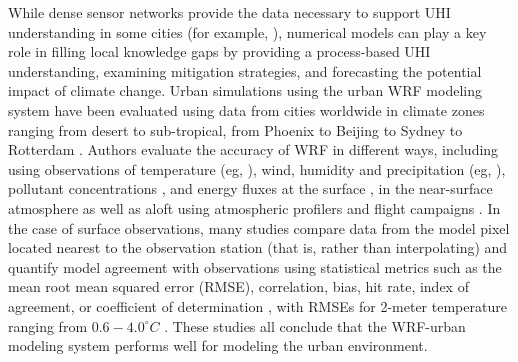 \documentclass[draft,linenumbers]{agujournal}
\begin{document}
While dense sensor networks provide the data necessary to support UHI understanding in some cities (for example, \cite{scott2017intraurban,scott2017temperature,madisonUHI,minneapolisUHI,tokyoUHI}), numerical models can play a key role in filling local knowledge gaps by providing a process-based UHI understanding, examining mitigation strategies, and forecasting the potential impact of climate change. 
Urban simulations using the urban WRF modeling system \citep{chen2011integrated} have been evaluated using data from cities worldwide in climate zones ranging from desert to sub-tropical, from Phoenix \citep{georgescu2013summer} to Beijing \citep{wang2013modeling} to Sydney \citep{argueso2014temperature} to Rotterdam \citep{theeuwes2014seasonal}. 
Authors evaluate the accuracy of WRF in different ways,
including using observations of temperature (eg, \citet{kusaka2012numerical}), wind, humidity and precipitation (eg, \cite{miao2011impacts,chen2011numerical}), pollutant concentrations \citep{brioude2013top}, and energy fluxes at the surface \citep{yang2015enhancing,loridan2012multi}, in the near-surface atmosphere as well as aloft using atmospheric profilers and flight campaigns \citep{li2013development}. 
In the case of surface observations, many studies compare data from the model pixel located nearest to the observation station (that is, rather than interpolating) and quantify model agreement with observations using statistical metrics such as the mean root mean squared error (RMSE), correlation, bias, hit rate, index of agreement, or coefficient of determination \citep{loridan2010trade,salamanca2011study,lee2011evaluation,chen2011numerical,chen2014wrf,li2013multi}, with RMSEs for 2-meter temperature ranging from $0.6-4.0^\circ C$ \citep{kim2013evaluation}. These studies 
all conclude that the WRF-urban modeling system performs well for modeling the urban environment. %
\end{document}
